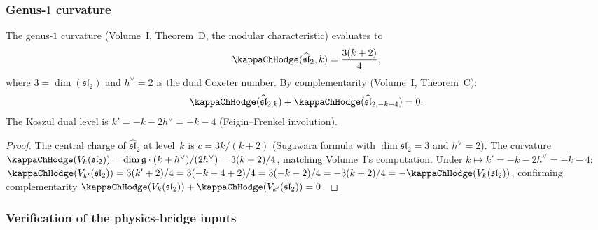 \subsubsection{Genus-$1$ curvature}

\begin{proposition}
\label{prop:su2-curvature}
The genus-$1$ curvature
(Volume~I, Theorem~D, the modular characteristic) evaluates to
\begin{equation}\label{eq:su2-curvature}
\kappaChHodge(\widehat{\mathfrak{sl}}_2, k) = \frac{3(k + 2)}{4},
\end{equation}
where $3 = \dim(\mathfrak{sl}_2)$ and $h^\vee = 2$ is the
dual Coxeter number. By complementarity (Volume~I, Theorem~C):
\begin{equation}
\kappaChHodge(\widehat{\mathfrak{sl}}_{2,k})
+ \kappaChHodge(\widehat{\mathfrak{sl}}_{2,-k-4}) = 0.
\end{equation}
The Koszul dual level is $k' = -k - 2h^\vee = -k - 4$
(Feigin--Frenkel involution).
\end{proposition}

\begin{proof}
The central charge of $\widehat{\mathfrak{sl}}_2$ at level~$k$
is $c = 3k/(k+2)$ (Sugawara formula with $\dim\mathfrak{sl}_2 = 3$
and $h^\vee = 2$). The curvature $\kappaChHodge(V_k(\mathfrak{sl}_2)) = \dim\mathfrak{g}\cdot(k+h^\vee)/(2h^\vee) = 3(k+2)/4$, matching Volume~I's computation.
Under $k \mapsto k' = -k - 2h^\vee = -k - 4$:
$\kappaChHodge(V_{k'}(\mathfrak{sl}_2)) = 3(k'+2)/4 = 3(-k-4+2)/4 = 3(-k-2)/4 = -3(k+2)/4 = -\kappaChHodge(V_k(\mathfrak{sl}_2))$,
confirming complementarity $\kappaChHodge(V_k(\mathfrak{sl}_2)) + \kappaChHodge(V_{k'}(\mathfrak{sl}_2)) = 0$.
\end{proof}

\subsubsection{Verification of the physics-bridge inputs}
\label{subsubsec:su2-verification}

